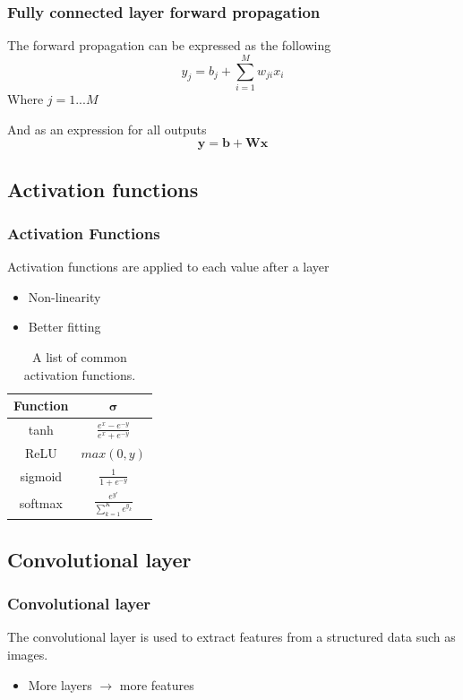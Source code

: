 \documentclass{beamer}
\begin{document}
\begin{frame}
    \frametitle{Fully connected layer forward propagation}

    The forward propagation can be expressed as the following
    $$y_j = b_j + \sum^M_{i=1} w_{ji}x_i$$
    Where $j = 1...M$

    \pause
    And as an expression for all outputs
    $$\bm{y} = \bm{b} + \bm{Wx}$$
\end{frame}

\subsection{Activation functions}

\begin{frame}
    \frametitle{Activation Functions}
    Activation functions are applied to each value after a layer
    \begin{itemize}
        \item Non-linearity
        \item Better fitting
    \end{itemize}
    \pause

    \begin{table}[H]
    \centering
    \begin{tabular}{|c|c|}\hline
    \textbf{Function} & $\bm{\sigma}$ \\\hline
    tanh     & $\frac{e^x - e^{-y}}{e^x + e^{-y}}$ \\\hline
    ReLU     & $max(0, y)$ \\\hline
    sigmoid  & $\frac{1}{1+e^{-y}}$ \\\hline
    softmax  & $\frac{e^{y'}}{\sum^K_{k=1} e^{y_k}}$ \\\hline
    \end{tabular}
    \caption{A list of common activation functions.}
    \label{tab:activation}
    \end{table}
\end{frame}

\subsection{Convolutional layer}

\begin{frame}
    \frametitle{Convolutional layer}
    The convolutional layer is used to extract features from a structured data such as images.
    \begin{itemize}
        \item More layers $\rightarrow$ more features
    \end{itemize}
\end{frame}
\end{document}
